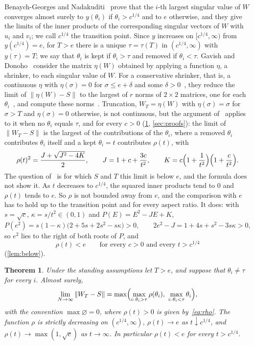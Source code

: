 \documentclass[11pt]{amsart}
\newtheorem{thm}{Theorem}[section]
\theoremstyle{remark}
\numberwithin{equation}{section}
\begin{document}
Benaych-Georges and Nadakuditi~\cite[Theorems~2.8 and~2.9]{BGN} prove that the $i$-th largest singular value of $W$ converges almost surely to $y(\theta_i)$ if $\theta_i>c^{1/4}$ and to $e$ otherwise, and they give the limits of the inner products of the corresponding singular vectors of $W$ with $u_i$ and $v_i$; we call $c^{1/4}$ the transition point. Since $y$ increases on $[c^{1/4},\infty)$ from $y(c^{1/4})=e$, for $T>e$ there is a unique $\tau=\tau(T)$ in $(c^{1/4},\infty)$ with $y(\tau)=T$; we say that $\theta_i$ is kept if $\theta_i>\tau$ and removed if $\theta_i<\tau$. Gavish and Donoho~\cite[Section~5]{GD} consider the matrix $\eta(W)$ obtained by applying a function $\eta$, a shrinker, to each singular value of $W$. For a conservative shrinker, that is, a continuous $\eta$ with $\eta(\sigma)=0$ for $\sigma\le e+\delta$ and some $\delta>0$~\cite[Definition~3]{GD}, they reduce the limit of $\|\eta(W)-S\|$ to the largest of $r$ norms of $2\times2$ matrices, one for each $\theta_i$~\cite[Lemmas~8 and~9]{GD}, and compute these norms~\cite[Lemma~13]{GD}. Truncation, $W_T=\eta(W)$ with $\eta(\sigma)=\sigma$ for $\sigma>T$ and $\eta(\sigma)=0$ otherwise, is not continuous, but the argument of~\cite[Section~5]{GD} applies to it when no $\theta_i$ equals $\tau$, and for every $c>0$ (\cref{thm:main}, \cref{sec:proofs}): the limit of $\|W_T-S\|$ is the largest of the contributions of the $\theta_i$, where a removed $\theta_i$ contributes $\theta_i$ itself and a kept $\theta_i=t$ contributes $\rho(t)$, with
\begin{equation}\label{eq:rho}
\rho(t)^2=\frac{J+\sqrt{J^2-4K}}2,\qquad J=1+c+\frac{3c}{t^2},\qquad K=c\Bigl(1+\frac1{t^2}\Bigr)\Bigl(1+\frac c{t^2}\Bigr).
\end{equation}
The question of~\cite{BSSZ} is for which $S$ and $T$ this limit is below $e$, and the formula does not show it. As $t$ decreases to $c^{1/4}$, the squared inner products tend to $0$ and $\rho(t)$ tends to $e$. So $\rho$ is not bounded away from $e$, and the comparison with $e$ has to hold up to the transition point and for every aspect ratio. It does: with $s=\sqrt c$, $\kappa=s/t^2\in(0,1)$ and $P(E)=E^2-JE+K$,
\[
P(e^2)=s(1-\kappa)\bigl(2+5s+2s^2-s\kappa\bigr)>0,\qquad 2e^2-J=1+4s+s^2-3s\kappa>0,
\]
so $e^2$ lies to the right of both roots of $P$, and
\begin{equation}\label{eq:below}
\rho(t)<e\qquad\text{for every }c>0\text{ and every }t>c^{1/4}
\end{equation}
(\cref{lem:below}).

\begin{thm}\label{thm:main}
Under the standing assumptions let $T>e$, and suppose that $\theta_i\ne\tau$ for every $i$. Almost surely,
\[
\lim_{N\to\infty}\|W_T-S\|=\max\Bigl(\max_{i:\,\theta_i>\tau}\rho(\theta_i),\ \max_{i:\,\theta_i<\tau}\theta_i\Bigr),
\]
with the convention $\max\varnothing=0$, where $\rho(t)>0$ is given by~\eqref{eq:rho}. The function $\rho$ is strictly decreasing on $(c^{1/4},\infty)$, $\rho(t)\to e$ as $t\downarrow c^{1/4}$, and $\rho(t)\to\max(1,\sqrt c)$ as $t\to\infty$. In particular $\rho(t)<e$ for every $t>c^{1/4}$.
\end{thm}
\end{document}
